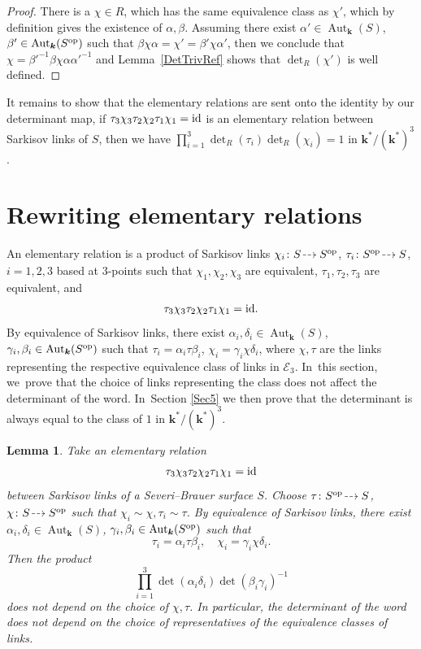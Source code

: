 \documentclass[JEP,XML,SOM,Unicode,NoFloatCountersInSection, NoEqCountersInSection,published]{cedram}
\newcommand{\dradpl}{{\hspace*{-2mm}\begin{tikzcd}[ampersand replacement=\&,column sep = scriptsize]\mbox{}\ar[r,dashed]\&\mbox{}\end{tikzcd}\hspace*{-2mm}}}
\newcommand{\dratst}{{\hspace*{-2.5mm}\begin{tikzcd}[ampersand replacement=\&,column sep = small]\mbox{}\ar[r,dashed]\&\mbox{}\end{tikzcd}\hspace*{-2mm}}}
\let\drascst\dratst
\newcommand{\dra}{\mathchoice{\dradpl}{\dratst}{\drascst}{\drascst}}
\newcommand{\id}{\textup{id}}
\newcommand{\op}{\textup{op}}
\newtheorem{lemma}[theorem]{Lemma}
\theoremstyle{definition}
\newcommand{\kk}{{\boldsymbol{k}}}
\DeclareMathOperator{\Aut}{Aut}
\begin{document}
\begin{proof}
There is a $\chi \in R$, which has the same equivalence class as $\chi'$, which by definition gives the existence of $\alpha, \beta$. Assuming there exist $\alpha' \in \Aut_{\kk}(S)$, $\beta' \in \Aut_{\kk}(S^{\op})$ such that $\beta \chi \alpha = \chi' = \beta' \chi \alpha'$, then we conclude that $\chi = \beta'^{-1}\beta \chi \alpha \alpha'^{-1}$ and Lem\-ma~\ref{DetTrivRef} shows that $\det_R(\chi')$ is well defined.
\end{proof}

It remains to show that the elementary relations are sent onto the identity by our determinant map, \ie if $\tau_3\chi_3\tau_2\chi_2\tau_1\chi_1 = \id$ is an elementary relation between Sarkisov links of $S$, then we have $\prod_{i=1}^3 \det_R(\tau_i)\det_R(\chi_i) = 1$ in $\kk^* /(\kk^*)^3$.

\section{Rewriting elementary relations}
An elementary relation is a product of Sarkisov links $\chi_i \colon S \dra S^{\op}$, $\tau_i \colon S^{\op} \dra S$, $i=1,2,3$ based at $3$\nobreakdash-points such that $\chi_1,\chi_2,\chi_3$ are equivalent, $\tau_1,\tau_2,\tau_3$ are equivalent, and
\[
\tau_3\chi_3\tau_2\chi_2\tau_1\chi_1 = \id.
\]
By equivalence of Sarkisov links, there exist $\alpha_i, \delta_i \in \Aut_{\kk}(S)$, $\gamma_i, \beta_i \in \Aut_{\kk}(S^{\op})$ such that $\tau_i = \alpha_i \tau \beta_i$, $\chi_i = \gamma_i \chi \delta_i$, where $\chi, \tau$ are the links representing the respective equivalence class of links in $\mathcal{E}_3$. In~this section, we~prove that the choice of links representing the class does not affect the determinant of the word. In~Section \ref{Sec5} we then prove that the determinant is always equal to the class of $1$ in $\kk^*/(\kk^*)^3$.

\begin{lemma}\label{Subst}
Take an elementary relation
\[
\tau_3\chi_3\tau_2\chi_2\tau_1\chi_1 = \id
\]
between Sarkisov links of a Severi--Brauer surface $S$. Choose $\tau \colon S^{\op} \dra S$, $\chi \colon S \dra S^{\op}$ such that $\chi_i \sim \chi, \tau_i \sim \tau$. By equivalence of Sarkisov links, there exist $\alpha_i, \delta_i \in \Aut_{\kk}(S)$, $\gamma_i, \beta_i \in \Aut_{\kk}(S^{\op})$ such that
\[
\tau_i = \alpha_i \tau \beta_i, \quad \chi_i = \gamma_i \chi \delta_i.
\]
Then the product
\[
\prod_{i=1}^3 \det(\alpha_i\delta_i)\det(\beta_i\gamma_i)^{-1}
\]
does not depend on the choice of $\chi, \tau$.
In particular, the determinant of the word does not depend on the choice of representatives of the equivalence classes of links.
\end{lemma}
\end{document}
